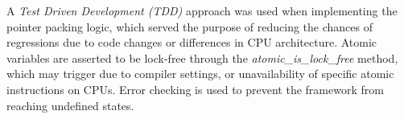 A \emph{Test Driven Development (TDD)} approach was used when implementing the
pointer packing logic, which served the purpose of reducing the chances of
regressions due to code changes or differences in CPU architecture. Atomic
variables are asserted to be lock-free through the
\emph{atomic\_is\_lock\_free} method, which may trigger due to compiler settings,
or unavailability of specific atomic instructions on CPUs. Error checking is
used to prevent the framework from reaching undefined states.
